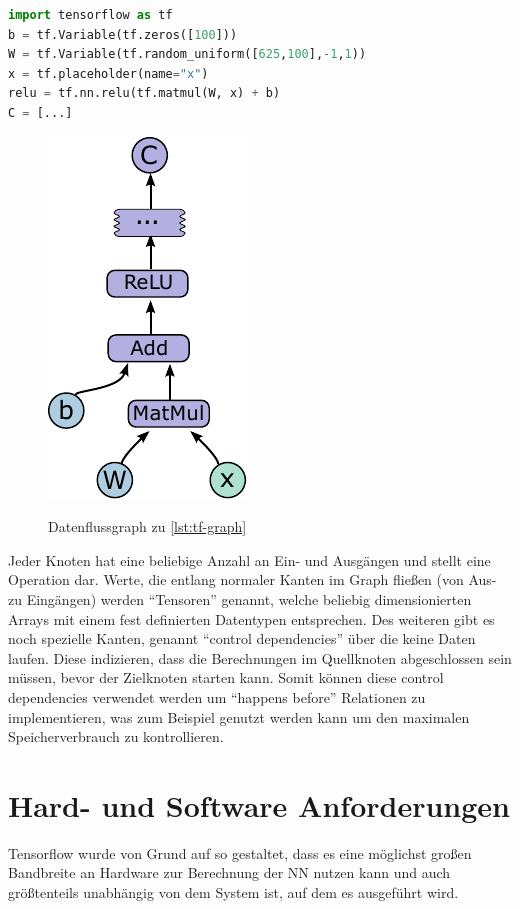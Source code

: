 \begin{minipage}{\linewidth}
\begin{lstlisting}[language=Python, label=lst:tf-graph, caption={Code-Beispiel zur Definition eines Graphen~\cite{tensorflow2015-whitepaper}}]
import tensorflow as tf
b = tf.Variable(tf.zeros([100]))
W = tf.Variable(tf.random_uniform([625,100],-1,1))
x = tf.placeholder(name="x")
relu = tf.nn.relu(tf.matmul(W, x) + b)
C = [...]
\end{lstlisting}
\end{minipage}

\begin{figure}[htb!]
	\centering
	 \includegraphics[width=.3\textwidth]{images/graph.pdf}\\
	\vspace{10pt} 
	\caption{Datenflussgraph zu \autoref{lst:tf-graph}~\cite{tensorflow2015-whitepaper}}
	\label{fig:dataflow}
\end{figure}

Jeder Knoten hat eine beliebige Anzahl an Ein- und Ausgängen und stellt eine Operation dar. Werte, die entlang normaler Kanten im Graph fließen (von Aus- zu Eingängen) werden "`Tensoren"' genannt, welche beliebig dimensionierten Arrays mit einem fest definierten Datentypen entsprechen. Des weiteren gibt es noch spezielle Kanten, genannt "`control dependencies"' über die keine Daten laufen. Diese indizieren, dass die Berechnungen im Quellknoten abgeschlossen sein müssen, bevor der Zielknoten starten kann. Somit können diese control dependencies verwendet werden um "`happens before"' Relationen zu implementieren, was zum Beispiel genutzt werden kann um den maximalen Speicherverbrauch zu kontrollieren.

\section{Hard- und Software Anforderungen}
Tensorflow wurde von Grund auf so gestaltet, dass es eine möglichst großen Bandbreite an Hardware zur Berechnung der \gls{NN} nutzen kann und auch größtenteils unabhängig von dem System ist, auf dem es ausgeführt wird.

